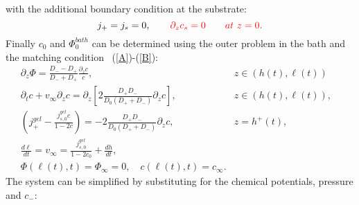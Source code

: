 \documentclass[12pt]{extarticle}
\begin{document}
with the additional boundary condition at the substrate:
\begin{equation}
j_+= j_s = 0, \qquad \color{red} \partial_z c_s=0 \qquad at\  z=0.
\end{equation}
Finally $c_0$ and $\Phi^{bath}_0$ can be determined using the outer problem in the bath and the matching condition ~(\ref{A})-(\ref{B}):
\begin{eqnarray}
 \partial_z \Phi = \frac{D_--D_+}{D_-+D_+} \frac{\partial_z c}{c}, &z\in\left(h(t),\ell(t)\right)&\\
\partial_t c + v_\infty \partial_z c= \partial_z\left[2\frac{D_+D_-}{D_0(D_++D_-)}  \partial_z c\right], &z\in\left(h(t),\ell(t)\right),&\\
\left(j^{gel}_+-\frac{j_{s,0}^{gel}c}{1-2c}\right) =- 2 \frac{D_+D_-}{D_0(D_++D_-)}\partial_z c, & z=h^+(t),&\\
\frac{d\ell}{dt}=v_\infty=\frac{j^{gel}_{s,0}}{1-2c_0}+\frac{dh}{dt},\\
\Phi(\ell(t),t)=\Phi_\infty=0,\quad c(\ell(t),t)=c_\infty.
\end{eqnarray}
The system can be simplified by substituting for the chemical potentials, pressure and $c_-$:
\end{document}
